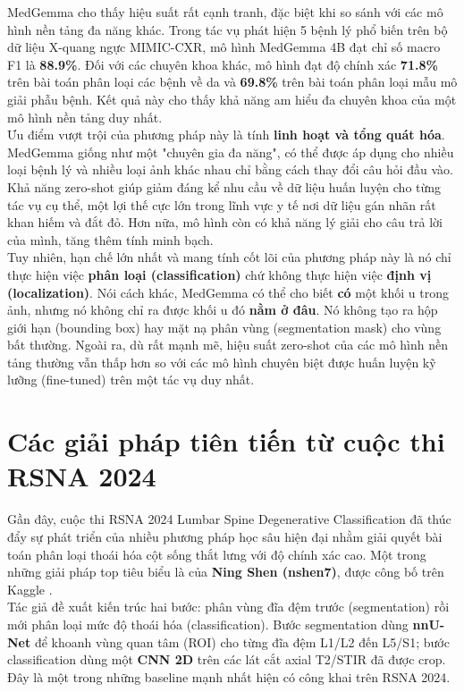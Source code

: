 MedGemma cho thấy hiệu suất rất cạnh tranh, đặc biệt khi so sánh với các mô hình nền tảng đa năng khác. Trong tác vụ phát hiện 5 bệnh lý phổ biến trên bộ dữ liệu X-quang ngực MIMIC-CXR, mô hình MedGemma 4B đạt chỉ số macro F1 là \textbf{88.9\%}. Đối với các chuyên khoa khác, mô hình đạt độ chính xác \textbf{71.8\%} trên bài toán phân loại các bệnh về da và \textbf{69.8\%} trên bài toán phân loại mẫu mô giải phẫu bệnh. Kết quả này cho thấy khả năng am hiểu đa chuyên khoa của một mô hình nền tảng duy nhất.\\

Ưu điểm vượt trội của phương pháp này là tính \textbf{linh hoạt và tổng quát hóa}. MedGemma giống như một "chuyên gia đa năng", có thể được áp dụng cho nhiều loại bệnh lý và nhiều loại ảnh khác nhau chỉ bằng cách thay đổi câu hỏi đầu vào. Khả năng zero-shot giúp giảm đáng kể nhu cầu về dữ liệu huấn luyện cho từng tác vụ cụ thể, một lợi thế cực lớn trong lĩnh vực y tế nơi dữ liệu gán nhãn rất khan hiếm và đắt đỏ. Hơn nữa, mô hình còn có khả năng lý giải cho câu trả lời của mình, tăng thêm tính minh bạch.\\

Tuy nhiên, hạn chế lớn nhất và mang tính cốt lõi của phương pháp này là nó chỉ thực hiện việc \textbf{phân loại (classification)} chứ không thực hiện việc \textbf{định vị (localization)}. Nói cách khác, MedGemma có thể cho biết \textbf{có} một khối u trong ảnh, nhưng nó không chỉ ra được khối u đó \textbf{nằm ở đâu}. Nó không tạo ra hộp giới hạn (bounding box) hay mặt nạ phân vùng (segmentation mask) cho vùng bất thường. Ngoài ra, dù rất mạnh mẽ, hiệu suất zero-shot của các mô hình nền tảng thường vẫn thấp hơn so với các mô hình chuyên biệt được huấn luyện kỹ lưỡng (fine-tuned) trên một tác vụ duy nhất.

\section{Các giải pháp tiên tiến từ cuộc thi RSNA 2024}

Gần đây, cuộc thi RSNA 2024 Lumbar Spine Degenerative Classification đã thúc đẩy sự phát triển của nhiều phương pháp học sâu hiện đại nhằm giải quyết bài toán phân loại thoái hóa cột sống thắt lưng với độ chính xác cao. Một trong những giải pháp top tiêu biểu là của \textbf{Ning Shen (nshen7)}, được công bố trên Kaggle \cite{nshen7_rsna2024}.\\

Tác giả đề xuất kiến trúc hai bước: phân vùng đĩa đệm trước (segmentation) rồi mới phân loại mức độ thoái hóa (classification). Bước segmentation dùng \textbf{nnU-Net} để khoanh vùng quan tâm (ROI) cho từng đĩa đệm L1/L2 đến L5/S1; bước classification dùng một \textbf{CNN 2D} trên các lát cắt axial T2/STIR đã được crop. Đây là một trong những baseline mạnh nhất hiện có công khai trên RSNA 2024.\\

